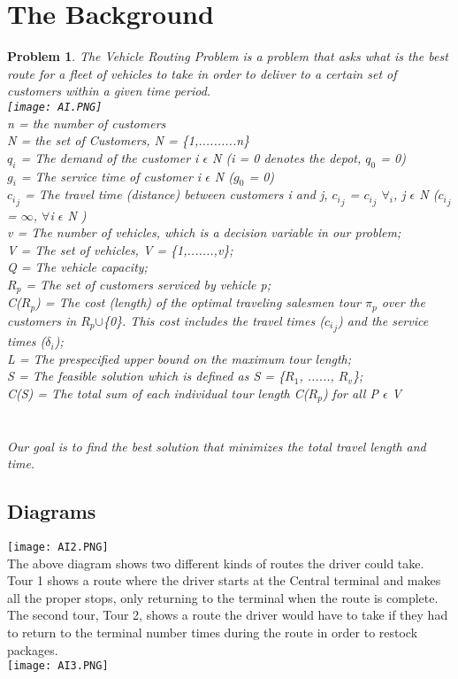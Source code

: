 \documentclass[11pt]{article}
\newcommand{\<}{\langle}
\renewcommand{\>}{\rangle}
\newtheorem*{problem}{Problem}
\theoremstyle{definition}
\begin{document}
\section{The Background} 
\begin{problem}
The Vehicle Routing Problem is a problem that asks what is the best route for a fleet of vehicles to take in order to deliver to a certain set of customers within a given time period.\\
\texttt{[image: AI.PNG]}\\
n = the number of customers\\
N = the set of Customers, N = \{1,..........n\}\\
$q_i$ = The demand of the customer i $\epsilon$ N (i = 0 denotes the depot, $q_0$ = 0)\\
$g_i$ = The service time of customer i $\epsilon$ N ($g_0$ = 0)\\
${c_i}_j$ = The travel time (distance) between customers i and j, ${c_i}_j$ = ${c_i}_j$ $\forall_i$, j $\epsilon$ N (${c_i}_j$ = $\infty$, $\forall$i $\epsilon$ N )\\
v = The number of vehicles, which is a \textit{decision} variable in our problem;\\
V = The set of vehicles, V = \{1,.......,v\};\\
Q = The vehicle capacity;\\
$R_p$ = The set of customers serviced by vehicle p;\\
C($R_p$) = The cost (length) of the optimal traveling salesmen tour $\pi_p$ over the customers in 
$R_p$$\cup$\{0\}. This cost includes the travel times (${c_i}_j$) and the service times ($\delta_i$);\\
L = The prespecified upper bound on the maximum tour length;\\
S = The feasible solution which is defined as S = \{$R_1$, ......, $R_v$\};\\
C(S) = The total sum of each individual tour length C($R_p$) for all P $\epsilon$ V\\\\\\
Our goal is to find the best solution  that minimizes the total travel length and time.
\end{problem}
\subsection{Diagrams}
\texttt{[image: AI2.PNG]}\\
The above diagram shows two different kinds of routes the driver could take. Tour 1 shows a route where the driver starts at the Central terminal and makes all the proper stops, only returning to the terminal when the route is complete. The second tour, Tour 2, shows a route the driver would have to take if they had to return to the terminal number times during the route in order to restock packages.\\
\texttt{[image: AI3.PNG]}\\
\end{document}
